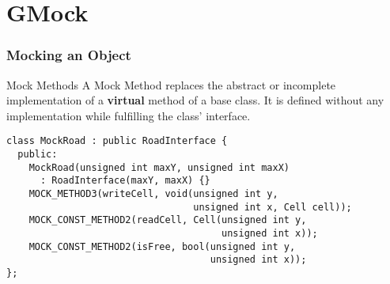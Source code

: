 \documentclass{beamer}
\begin{document}
\section{GMock}


\begin{frame}[fragile]
\frametitle{Mocking an Object}
  \begin{block}{Mock Methods}
    A Mock Method replaces the abstract or incomplete implementation of a {\bf virtual} method of a base class. It is defined without any implementation while fulfilling the class' interface.
  \end{block}
  \begin{lstlisting}[title=RoadInterface Mock Class, style=code, basicstyle=\ttfamily\footnotesize\color{white}]
class MockRoad : public RoadInterface {
  public:
    MockRoad(unsigned int maxY, unsigned int maxX)
      : RoadInterface(maxY, maxX) {}
    MOCK_METHOD3(writeCell, void(unsigned int y, 
                                 unsigned int x, Cell cell));
    MOCK_CONST_METHOD2(readCell, Cell(unsigned int y,
                                      unsigned int x));
    MOCK_CONST_METHOD2(isFree, bool(unsigned int y, 
                                    unsigned int x));
};
  \end{lstlisting}
\end{frame}
\end{document}
